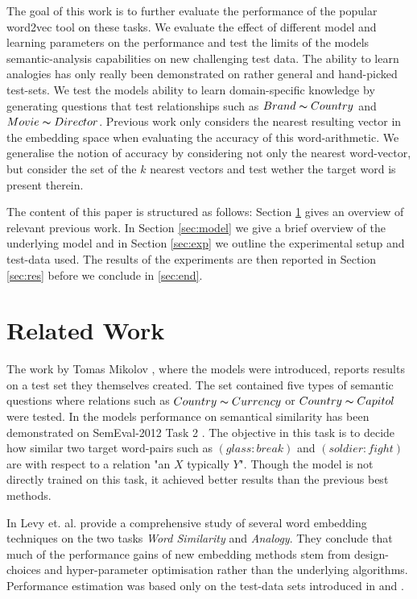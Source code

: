 \documentclass[conference]{IEEEtran}
\begin{document}
The goal of this work is to further evaluate the performance
of the popular word2vec tool on these tasks. We evaluate the effect of
different model and learning parameters on the performance  and test
the limits of the models semantic-analysis capabilities on new challenging test data. 
The ability to learn analogies has only really been demonstrated on rather general and 
hand-picked test-sets. We test the models ability to learn domain-specific knowledge by 
generating questions that test relationships such as $Brand \thicksim Country$ 
and $Movie \thicksim Director$. Previous work only considers the nearest 
resulting vector in the embedding space when evaluating the accuracy of this word-arithmetic. 
We generalise the notion of accuracy by considering not only the nearest word-vector, but 
consider the set of the $k$ nearest vectors and test wether the target word is present therein. 


The content of this paper is structured as follows: Section \ref{sec:relwork} gives an overview 
of relevant previous work. In Section \ref{sec:model} we give a brief overview of the underlying 
model and in Section \ref{sec:exp} we outline the experimental setup and test-data used. 
The results of the experiments are then reported in Section \ref{sec:res} before we conclude
in \ref{sec:end}.


\section{Related Work}
\label{sec:relwork}

The work by Tomas Mikolov \cite{mikolov2013efficient}, where the models were introduced,
reports results on a test set they themselves created. The set contained five types of semantic
questions where relations such as $Country \thicksim Currency$ or $Country \thicksim Capitol$
were tested. In \cite{mikolov2013linguistic} the models performance on semantical
similarity has been demonstrated on SemEval-2012 Task 2 \cite{jurgens2012semeval}.
The objective in this task is to decide how similar two target word-pairs such as
$(glass:break)$ and $(soldier:fight)$ are with respect to a relation "an $X$ typically $Y$". 
Though the model is not directly trained on this task, it achieved better results than  the previous
best methods. 

In \cite{levy2015improving} Levy et. al. provide a comprehensive study of several word 
embedding techniques on the two tasks \textit{Word Similarity} and \textit{Analogy}. 
They conclude that much of the performance gains of new embedding
methods stem from design-choices and hyper-parameter optimisation rather than the 
underlying algorithms. Performance estimation was based only on the test-data sets 
introduced in \cite{mikolov2013efficient} and \cite{mikolov2013linguistic}.
\end{document}
